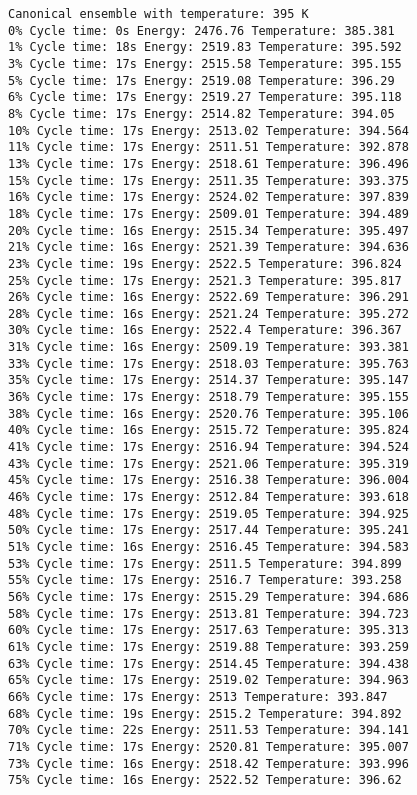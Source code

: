 \documentclass{article}
\begin{document}
\begin{verbatim}
Canonical ensemble with temperature: 395 K
0% Cycle time: 0s Energy: 2476.76 Temperature: 385.381
1% Cycle time: 18s Energy: 2519.83 Temperature: 395.592
3% Cycle time: 17s Energy: 2515.58 Temperature: 395.155
5% Cycle time: 17s Energy: 2519.08 Temperature: 396.29
6% Cycle time: 17s Energy: 2519.27 Temperature: 395.118
8% Cycle time: 17s Energy: 2514.82 Temperature: 394.05
10% Cycle time: 17s Energy: 2513.02 Temperature: 394.564
11% Cycle time: 17s Energy: 2511.51 Temperature: 392.878
13% Cycle time: 17s Energy: 2518.61 Temperature: 396.496
15% Cycle time: 17s Energy: 2511.35 Temperature: 393.375
16% Cycle time: 17s Energy: 2524.02 Temperature: 397.839
18% Cycle time: 17s Energy: 2509.01 Temperature: 394.489
20% Cycle time: 16s Energy: 2515.34 Temperature: 395.497
21% Cycle time: 16s Energy: 2521.39 Temperature: 394.636
23% Cycle time: 19s Energy: 2522.5 Temperature: 396.824
25% Cycle time: 17s Energy: 2521.3 Temperature: 395.817
26% Cycle time: 16s Energy: 2522.69 Temperature: 396.291
28% Cycle time: 16s Energy: 2521.24 Temperature: 395.272
30% Cycle time: 16s Energy: 2522.4 Temperature: 396.367
31% Cycle time: 16s Energy: 2509.19 Temperature: 393.381
33% Cycle time: 17s Energy: 2518.03 Temperature: 395.763
35% Cycle time: 17s Energy: 2514.37 Temperature: 395.147
36% Cycle time: 17s Energy: 2518.79 Temperature: 395.155
38% Cycle time: 16s Energy: 2520.76 Temperature: 395.106
40% Cycle time: 16s Energy: 2515.72 Temperature: 395.824
41% Cycle time: 17s Energy: 2516.94 Temperature: 394.524
43% Cycle time: 17s Energy: 2521.06 Temperature: 395.319
45% Cycle time: 17s Energy: 2516.38 Temperature: 396.004
46% Cycle time: 17s Energy: 2512.84 Temperature: 393.618
48% Cycle time: 17s Energy: 2519.05 Temperature: 394.925
50% Cycle time: 17s Energy: 2517.44 Temperature: 395.241
51% Cycle time: 16s Energy: 2516.45 Temperature: 394.583
53% Cycle time: 17s Energy: 2511.5 Temperature: 394.899
55% Cycle time: 17s Energy: 2516.7 Temperature: 393.258
56% Cycle time: 17s Energy: 2515.29 Temperature: 394.686
58% Cycle time: 17s Energy: 2513.81 Temperature: 394.723
60% Cycle time: 17s Energy: 2517.63 Temperature: 395.313
61% Cycle time: 17s Energy: 2519.88 Temperature: 393.259
63% Cycle time: 17s Energy: 2514.45 Temperature: 394.438
65% Cycle time: 17s Energy: 2519.02 Temperature: 394.963
66% Cycle time: 17s Energy: 2513 Temperature: 393.847
68% Cycle time: 19s Energy: 2515.2 Temperature: 394.892
70% Cycle time: 22s Energy: 2511.53 Temperature: 394.141
71% Cycle time: 17s Energy: 2520.81 Temperature: 395.007
73% Cycle time: 16s Energy: 2518.42 Temperature: 393.996
75% Cycle time: 16s Energy: 2522.52 Temperature: 396.62

\end{verbatim}
\end{document}
